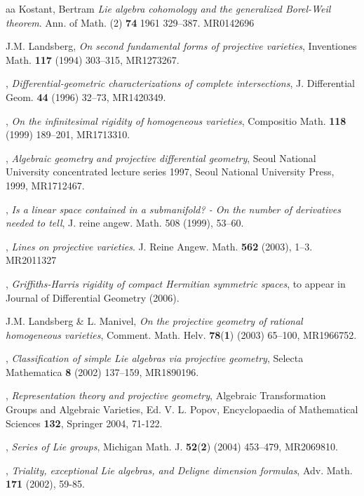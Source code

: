 \documentclass[11pt]{amsart}
\theoremstyle{definition}
\theoremstyle{remark}
\numberwithin{equation}{section}
\begin{document}
\begin{thebibliography}{aa}
   Kostant, Bertram 
{\it Lie algebra cohomology and the generalized Borel-Weil theorem}.  Ann. of Math. (2)  {\bf 74}  1961 329--387.
MR0142696

 J.M. Landsberg,
{\it On second fundamental forms of projective varieties},
Inventiones Math. {\bf 117} (1994) 303--315,
MR1273267.

 \bysame,
{\it Differential-geometric characterizations of complete
intersections}, 
J. Differential Geom. {\bf 44} (1996) 32--73,
MR1420349.

 \bysame, 
{\it On the infinitesimal rigidity of homogeneous varieties}, 
Compositio Math. {\bf 118} (1999) 189--201,
MR1713310.

 \bysame,
{\it Algebraic geometry and projective differential geometry}, 
Seoul National University concentrated lecture series 1997, 
Seoul National University Press, 1999, 
MR1712467.

 \bysame,
{\it Is a linear space contained in a submanifold?
- On the number of derivatives needed to tell},
{  J. reine angew. Math.} 508 (1999), 53--60.


\bysame,
{\it Lines on projective varieties}.  J. Reine Angew. Math.  {\bf 562}  (2003), 1--3. MR2011327

 \bysame,
{\it Griffiths-Harris rigidity of compact Hermitian symmetric spaces}, 
to appear in Journal of Differential 
Geometry (2006).

 J.M. Landsberg \& L. Manivel, 
{\it On the projective geometry of rational homogeneous varieties},
Comment. Math. Helv. {\bf 78}({\bf 1}) (2003) 65--100,
MR1966752.

 \bysame, 
{\it Classification of simple Lie algebras via projective geometry},  
Selecta Mathematica {\bf 8} (2002) 137--159,
MR1890196.


 \bysame,  {\sl Representation theory and projective 
geometry},  Algebraic Transformation Groups and Algebraic Varieties, 
Ed. V. L. Popov, Encyclopaedia of Mathematical Sciences {\bf 132}, Springer 2004,
 71-122. 


 \bysame,
{\it Series of Lie groups}, 
Michigan Math. J. {\bf 52}({\bf 2}) (2004) 453--479,
MR2069810.

 \bysame, {\sl  Triality, exceptional Lie algebras,
 and  Deligne dimension formulas}, Adv.  Math. {\bf 171} (2002), 59-85.



\end{thebibliography}
\end{document}
